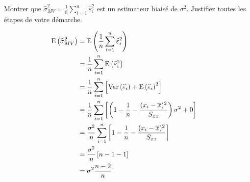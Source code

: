 \begin{questions}
Montrer que $ \displaystyle \widehat\sigma_{MV}^2=\frac{\displaystyle 1}{\displaystyle n}\sum\limits_{i=1}^n \widehat\varepsilon_i^2$
est un estimateur  biaisé de  $\sigma^2$. Justifiez toutes les étapes de votre démarche.



\begin{solution}
  \begin{align*}
            \mathrm{E}\left(\widehat{\sigma}_{MV}^2\right)
            &=\mathrm{E}\left(\frac{1}{n} \sum\limits_{i=1}^n \widehat\varepsilon_i^2\right) \cr
            &= \frac{1}{n} \sum\limits_{i=1}^n \mathrm{E}\left(\widehat\varepsilon_i^2\right) \cr
             &= \frac{1}{n} \sum\limits_{i=1}^n \left[ \mathrm{Var}\left(\widehat\varepsilon_i\right) + \mathrm{E}\left(\widehat\varepsilon_i\right)^2 \right]\cr
             &= \frac{1}{n} \sum\limits_{i=1}^n \left[ \left(1- \frac{1}{n} - \frac{(x_i - \overline{x})^2}{S_{xx}}\right)\sigma^2+ 0\right]\cr
             &= \frac{\sigma^2}{n} \sum\limits_{i=1}^n \left[ 1- \frac{1}{n} - \frac{(x_i - \overline{x})^2}{S_{xx}}\right]\cr
             &= \frac{\sigma^2}{n}  \left[ n- 1 - 1\right]\cr
             &= \sigma^2 \frac{n-2}{n}
        \end{align*}
\end{solution}



\end{questions}
